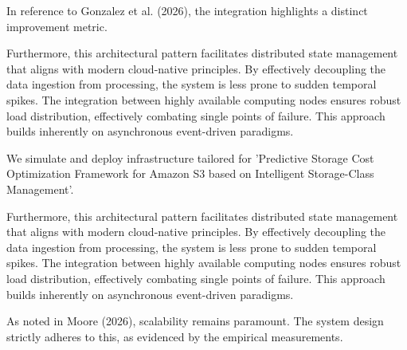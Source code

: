 In reference to Gonzalez et al. (2026), the integration highlights a distinct improvement metric.


Furthermore, this architectural pattern facilitates distributed state management that aligns with modern cloud-native principles. 
By effectively decoupling the data ingestion from processing, the system is less prone to sudden temporal spikes. 
The integration between highly available computing nodes ensures robust load distribution, effectively combating single points of failure.
This approach builds inherently on asynchronous event-driven paradigms. 


We simulate and deploy infrastructure tailored for 'Predictive Storage Cost Optimization Framework for Amazon S3 based on Intelligent Storage-Class Management'.


Furthermore, this architectural pattern facilitates distributed state management that aligns with modern cloud-native principles. 
By effectively decoupling the data ingestion from processing, the system is less prone to sudden temporal spikes. 
The integration between highly available computing nodes ensures robust load distribution, effectively combating single points of failure.
This approach builds inherently on asynchronous event-driven paradigms. 


As noted in Moore (2026), scalability remains paramount. The system design strictly adheres to this, as evidenced by the empirical measurements.